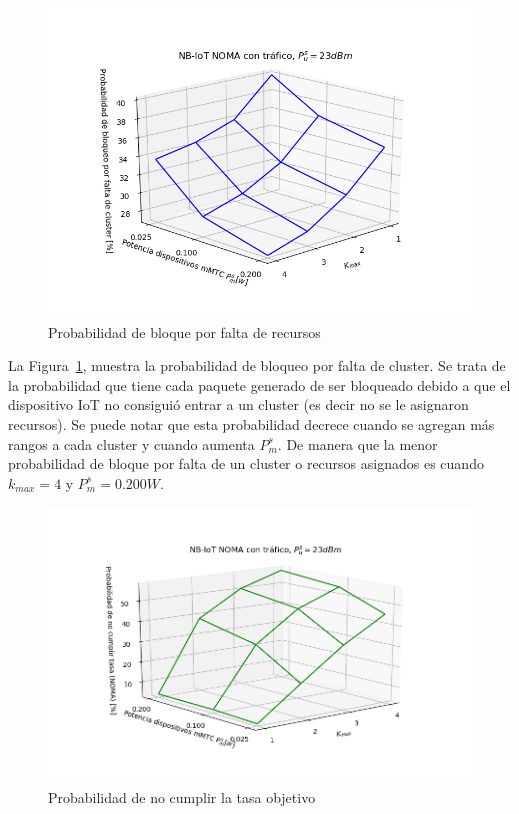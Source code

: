 \begin{figure}[th]
    \centering
    \includegraphics[scale=0.8]{Figures/ResultadosTrafico/Figure_1.png}
    \decoRule
    \caption[Probabilidad de bloque por falta de recursos]{Probabilidad de bloque por falta de recursos}
    \label{fig:bloqueocluster}
\end{figure}

La Figura~\ref{fig:bloqueocluster}, muestra la probabilidad de bloqueo por falta de cluster. Se trata de la probabilidad que tiene cada paquete generado de ser bloqueado debido a que el dispositivo IoT no consiguió entrar a un cluster (es decir no se le asignaron recursos). Se puede notar que esta probabilidad decrece cuando se agregan más rangos a cada cluster y cuando aumenta $P_{m}^{s}$. De manera que la menor probabilidad de bloque por falta de un cluster o recursos asignados es cuando $k_{max}=4$ y $P_{m}^{s}=0.200 W$. \newline

\break

\begin{figure}[th]
    \centering
    \includegraphics[scale=0.8]{Figures/ResultadosTrafico/Figure_2.png}
    \decoRule
    \caption[Probabilidad de no cumplir la tasa objetivo]{Probabilidad de no cumplir la tasa objetivo}
    \label{fig:tasa}
\end{figure}

